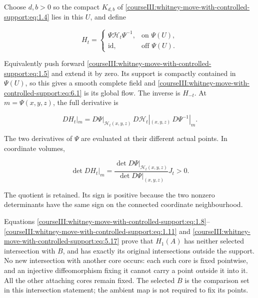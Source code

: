 \label{courseIII:whitney-move-with-controlled-support:section-6}\label{courseIII:whitney-support:6}

Choose \(d,b>0\) so the compact \(K_{d,b}\) of \eqref{courseIII:whitney-move-with-controlled-support:eq:1.4} lies in this \(U\), and define

\begin{equation}
H_t=
\begin{cases}
\Psi\mathcal H_t\Psi^{-1},&\text{on }\Psi(U),\\
\mathrm{id},&\text{off }\Psi(U).
\end{cases}
\label{courseIII:whitney-move-with-controlled-support:eq:6.1}
\end{equation}

Equivalently push forward \eqref{courseIII:whitney-move-with-controlled-support:eq:1.5} and extend it by zero. Its support is compactly contained in \(\Psi(U)\), so this gives a smooth complete field and \eqref{courseIII:whitney-move-with-controlled-support:eq:6.1} is its global flow. The inverse is \(H_{-t}\). At \(m=\Psi(x,y,z)\), the full derivative is

\begin{equation}
DH_t|_m=
D\Psi|_{\mathcal H_t(x,y,z)}
\,D\mathcal H_t|_{(x,y,z)}
\,D\Psi^{-1}|_m.
\label{courseIII:whitney-move-with-controlled-support:eq:6.2}
\end{equation}

The two derivatives of \(\Psi\) are evaluated at their different actual points. In coordinate volumes,

\begin{equation}
\det DH_t|_m=
\frac{\det D\Psi|_{\mathcal H_t(x,y,z)}}
{\det D\Psi|_{(x,y,z)}}J_t>0.
\label{courseIII:whitney-move-with-controlled-support:eq:6.3}
\end{equation}

The quotient is retained. Its sign is positive because the two nonzero determinants have the same sign on the connected coordinate neighbourhood.

Equations \eqref{courseIII:whitney-move-with-controlled-support:eq:1.8}--\eqref{courseIII:whitney-move-with-controlled-support:eq:1.11} and \eqref{courseIII:whitney-move-with-controlled-support:eq:5.17} prove that \(H_1(A)\) has neither selected intersection with \(B\), and has exactly its original intersections outside the support. No new intersection with another core occurs: each such core is fixed pointwise, and an injective diffeomorphism fixing it cannot carry a point outside it into it. All the other attaching cores remain fixed. The selected \(B\) is the comparison set in this intersection statement; the ambient map is not required to fix its points.

